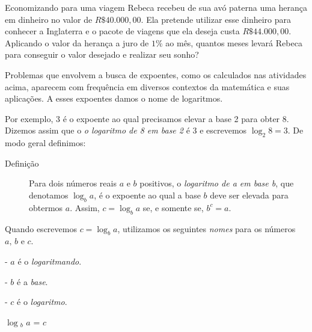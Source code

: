 

\begin{task}{Economizando para uma viagem}
Rebeca recebeu de sua avó paterna uma herança em dinheiro no valor de $R\$ 40.000{,}00$. Ela pretende utilizar esse dinheiro para conhecer a Inglaterra e o pacote de viagens que ela deseja custa $R\$ 44.000{,}00$. Aplicando o valor da herança a juro de $1\%$ ao mês, quantos meses levará Rebeca para conseguir o valor desejado e realizar seu sonho?
\end{task}

\label{organizando-as-ideias-logaritmos}

Problemas que envolvem a busca de expoentes, como os calculados nas atividades acima, aparecem com frequência em diversos contextos da matemática e suas aplicações. A esses expoentes damos o nome de logaritmos.


Por exemplo, 3 é o expoente ao qual precisamos elevar a base 2 para obter 8. Dizemos assim que o \textit{o logaritmo de 8 em base 2} é 3 e escrevemos $\log_2 8 = 3$. De modo geral definimos:


\begin{description}
\item[Definição]
Para dois números reais $a$ e $b$ positivos, o \textit{logaritmo de a em base b}, que denotamos $\log_b a$, é o expoente ao qual a base $b$ deve ser elevada para obtermos $a$. Assim, $c=\log_b a$ se, e somente se, $b^c=a$.
\end{description}

\begin{observation}{}
Quando escrevemos $c = \log_b a$, utilizamos os seguintes \textit{nomes} para os números $a,\,b$ e $c$.
\begin{center}
\begin{minipage}{0.3\linewidth}
\begin{flushleft}
- \textcolor{penlaranja}{$a$} é o \textcolor{penlaranja}{\textit{logaritmando}}.

- \textcolor{penaqua}{$b$} é a \textcolor{penaqua}{\textit{base}}.

- \textcolor{penazul}{$c$} é o \textcolor{penazul}{\textit{logaritmo}}.

\end{flushleft}
\end{minipage}
\begin{minipage}{0.3\linewidth}

\Huge $\log$\textcolor{penaqua}{$_b$} \textcolor{penlaranja}{$a$} = \textcolor{penazul}{$c$}

\end{minipage}
\end{center}
\end{observation}


